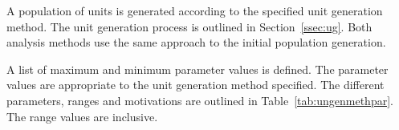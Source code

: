 A population of units is generated according to the specified unit generation method. The unit generation process is outlined in Section~\ref{ssec:ug}. Both analysis methods use the same approach to the initial population generation.

A list of maximum and minimum parameter values is defined. The parameter values are appropriate to the unit generation method specified. The different parameters, ranges and motivations are outlined in Table~\ref{tab:ungenmethpar}. The range values are inclusive.

\begin{table}[H]
\centering
{}
\end{table}
